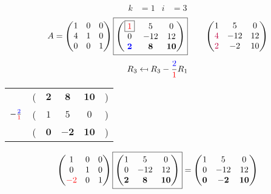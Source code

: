 \documentclass[pdf]{beamer}
\begin{document}
\begin{frame}{}\begin{align*} k &= 1 & i &= 3 \end{align*} $$A=\begin{pmatrix}1&0&0\\4&1&0\\0&0&1\end{pmatrix} \boxed{\begin{pmatrix}\boxed{{\color{red}1}}&5&0\\0&-12&12\\\mathbf{{\color{blue}2}}&\mathbf{8}&\mathbf{10}\end{pmatrix}} \quad\quad \begin{pmatrix}1&5&0\\{\color{purple}4}&-12&12\\{\color{purple}2}&-2&10\end{pmatrix}$$ $$R_3 \mapsfrom R_3 - \frac{{\color{blue}2}}{{\color{red}1}} R_1$$ \begin{center}\begin{tabular}{cccccc}  &(& $ \mathbf{2} $ & $ \mathbf{8} $ & $ \mathbf{10} $ &)\\$ -\frac{{\color{blue}2}}{{\color{red}1}} $&(& $ 1 $ & $ 5 $ & $ 0 $ &)\\\hline  &(& $ \mathbf{0} $ & $ \mathbf{-2} $ & $ \mathbf{10} $ &) \end{tabular}\end{center} $$ \begin{pmatrix}1&0&0\\0&1&0\\{\color{red}-2}&0&1\end{pmatrix} \boxed{\begin{pmatrix}1&5&0\\0&-12&12\\\mathbf{2}&\mathbf{8}&\mathbf{10}\end{pmatrix}} = \begin{pmatrix}1&5&0\\0&-12&12\\\mathbf{0}&\mathbf{-2}&\mathbf{10}\end{pmatrix} $$\end{frame}
\end{document}
